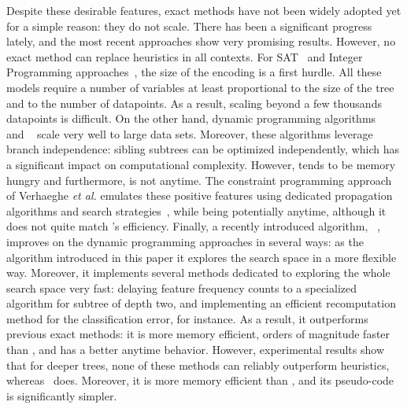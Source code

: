 \documentclass{article}
\begin{document}
Despite these desirable features, exact methods have not been widely adopted yet for a simple reason: they do not scale. There has been a significant progress lately, and the most recent approaches show very promising results. However, no exact method can replace heuristics in all contexts. 
For SAT~\cite{avellanedaefficient,narodytska2018learning} and Integer Programming approaches~\cite{aghaei2020learning,bertsimas2017optimal,bertsimas2007classification,verwer2019learning}, the size of the encoding is a first hurdle. All these models require a number of variables at least proportional to the size of the tree and to the number of datapoints. As a result, scaling beyond a few thousands datapoints is difficult. 
On the other hand, dynamic programming algorithms \olddleight~\cite{dl8} and \dleight~\cite{dl85} scale very well to large data sets. Moreover, these algorithms leverage branch independence: sibling subtrees can be optimized independently, which has a significant impact on computational complexity. However, \dleight tends to be memory hungry and furthermore, is not anytime.
The constraint programming approach of Verhaeghe \textit{et al.} emulates these positive features using dedicated propagation algorithms and search strategies~\cite{verhaeghe2019learning}, while being potentially anytime, although it does not quite match \dleight's efficiency.
Finally, a recently introduced algorithm, \murtree~\cite{DBLP:journals/corr/abs-2007-12652}, improves on the dynamic programming approaches in several ways: as the algorithm introduced in this paper it explores the search space in a more flexible way. Moreover, it implements several methods dedicated to exploring the whole search space very fast: delaying feature frequency counts to a specialized algorithm for subtree of depth two, and implementing an efficient recomputation method for the classification error, for instance.
As a result, it outperforms previous exact methods: it is more memory efficient, orders of magnitude faster than \dleight, and has a better anytime behavior. However, experimental results show that for deeper trees, none of these methods can reliably outperform heuristics, whereas \blossom\ does. Moreover, it is more memory efficient than \murtree, and its pseudo-code is significantly simpler.
 

%
\end{document}
